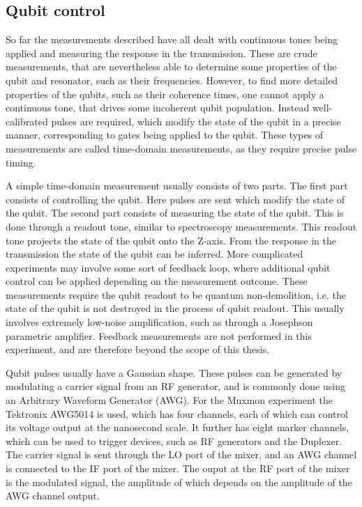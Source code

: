       \subsection{Qubit control}
        So far the measurements described have all dealt with continuous tones being applied and measuring the response in the transmission. These are crude measurements, that are nevertheless able to determine some properties of the qubit and resonator, such as their frequencies. However, to find more detailed properties of the qubits, such as their coherence times, one cannot apply a continuous tone, that drives some incoherent qubit population. Instead well-calibrated pulses are required, which modify the state of the qubit in a precise manner, corresponding to gates being applied to the qubit. These types of measurements are called time-domain measurements, as they require precise pulse timing.

        A simple time-domain measurement usually consists of two parts. The first part consists of controlling the qubit. Here pulses are sent which modify the state of the qubit. The second part consists of measuring the state of the qubit. This is done through a readout tone, similar to spectroscopy measurements. This readout tone projects the state of the qubit onto the Z-axis. From the response in the transmission the state of the qubit can be inferred. More complicated experiments may involve some sort of feedback loop, where additional qubit control can be applied depending on the measurement outcome. These measurements require the qubit readout to be quantum non-demolition, i.e. the state of the qubit is not destroyed in the process of qubit readout. This usually involves extremely low-noise amplification, such as through a Josephson parametric amplifier. Feedback measurements are not performed in this experiment, and are therefore beyond the scope of this thesis.

        Qubit pulses usually have a Gaussian shape. These pulses can be generated by modulating a carrier signal from an RF generator, and is commonly done using an Arbitrary Waveform Generator (AWG). For the Muxmon experiment the Tektronix AWG5014 is used, which has four channels, each of which can control its voltage output at the nanosecond scale. It further has eight marker channels, which can be used to trigger devices, such as RF generators and the Duplexer. The carrier signal is sent through the LO port of the mixer, and an AWG channel is connected to the IF port of the mixer. The ouput at the RF port of the mixer is the modulated signal, the amplitude of which depends on the amplitude of the AWG channel output.

